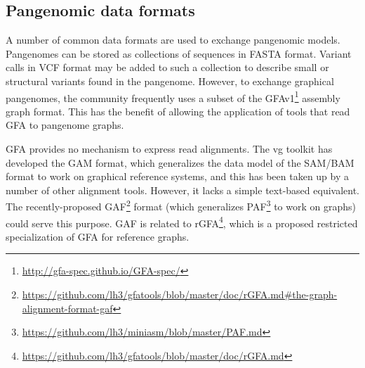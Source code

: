 \subsection{Pangenomic data formats}

A number of common data formats are used to exchange pangenomic models.
Pangenomes can be stored as collections of sequences in FASTA format.
Variant calls in VCF format may be added to such a collection to describe small or structural variants found in the pangenome.
However, to exchange graphical pangenomes, the community frequently uses a subset of the GFAv1\footnote{\url{http://gfa-spec.github.io/GFA-spec/}} assembly graph format.
This has the benefit of allowing the application of tools that read GFA to pangenome graphs.

GFA provides no mechanism to express read alignments.
The vg toolkit has developed the GAM format, which generalizes the data model of the SAM/BAM \cite{Li_2009} format to work on graphical reference systems, and this has been taken up by a number of other alignment tools.
However, it lacks a simple text-based equivalent.
The recently-proposed GAF\footnote{\url{https://github.com/lh3/gfatools/blob/master/doc/rGFA.md\#the-graph-alignment-format-gaf}} format (which generalizes PAF\footnote{\url{https://github.com/lh3/miniasm/blob/master/PAF.md}} to work on graphs) could serve this purpose.
GAF is related to rGFA\footnote{\url{https://github.com/lh3/gfatools/blob/master/doc/rGFA.md}}, which is a proposed restricted specialization of GFA for reference graphs.







